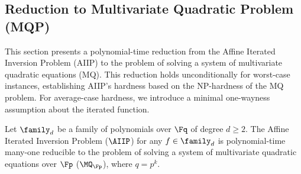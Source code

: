 \subsection{Reduction to Multivariate Quadratic Problem (MQP)}\label{subsec:mq-reduction}
            This section presents a polynomial-time reduction from the Affine Iterated Inversion Problem (AIIP) to the problem of solving a system of multivariate quadratic equations (MQ). This reduction holds unconditionally for worst-case instances, establishing AIIP's hardness based on the NP-hardness of the MQ problem. For average-case hardness, we introduce a minimal one-wayness assumption about the iterated function.
            \begin{theorem}\label{thm:aiip-mq-worstcase}
                Let $\family_d$ be a family of polynomials over $\Fq$ of degree $d \geq 2$. The Affine Iterated Inversion Problem ($\AIIP$) for any $f \in \family_d$ is polynomial-time many-one reducible to the problem of solving a system of multivariate quadratic equations over $\Fp$ ($\MQ_{\Fp}$), where $q = p^k$.
            \end{theorem}
